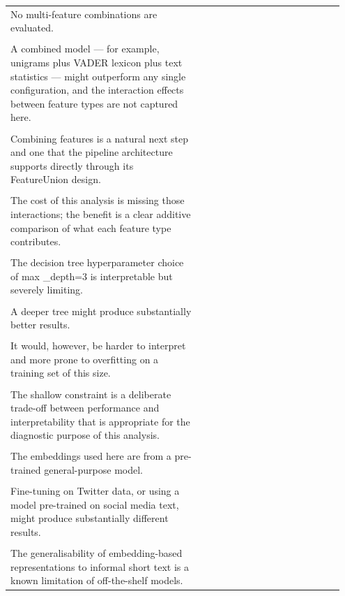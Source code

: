 \documentclass[11pt]{article}
\begin{document}
\begin{longtable}{|p{0.55\linewidth}|p{0.40\linewidth}|}
\hline
\rule{0pt}{3.5cm} & \\
\hline
No multi-feature combinations are evaluated. & \\[2pt]
\hline
\rule{0pt}{3.5cm} & \\
\hline
A combined model --- for example, unigrams plus VADER lexicon plus text statistics --- might outperform any single configuration, and the interaction effects between feature types are not captured here. & \\[2pt]
\hline
\rule{0pt}{3.5cm} & \\
\hline
Combining features is a natural next step and one that the pipeline architecture supports directly through its FeatureUnion design. & \\[2pt]
\hline
\rule{0pt}{3.5cm} & \\
\hline
The cost of this analysis is missing those interactions; the benefit is a clear additive comparison of what each feature type contributes. & \\[2pt]
\hline
\rule{0pt}{3.5cm} & \\
\hline
The decision tree hyperparameter choice of max \_depth=3 is interpretable but severely limiting. & \\[2pt]
\hline
\rule{0pt}{3.5cm} & \\
\hline
A deeper tree might produce substantially better results. & \\[2pt]
\hline
\rule{0pt}{3.5cm} & \\
\hline
It would, however, be harder to interpret and more prone to overfitting on a training set of this size. & \\[2pt]
\hline
\rule{0pt}{3.5cm} & \\
\hline
The shallow constraint is a deliberate trade-off between performance and interpretability that is appropriate for the diagnostic purpose of this analysis. & \\[2pt]
\hline
\rule{0pt}{3.5cm} & \\
\hline
The embeddings used here are from a pre-trained general-purpose model. & \\[2pt]
\hline
\rule{0pt}{3.5cm} & \\
\hline
Fine-tuning on Twitter data, or using a model pre-trained on social media text, might produce substantially different results. & \\[2pt]
\hline
\rule{0pt}{3.5cm} & \\
\hline
The generalisability of embedding-based representations to informal short text is a known limitation of off-the-shelf models. & \\[2pt]

\end{longtable}
\end{document}
